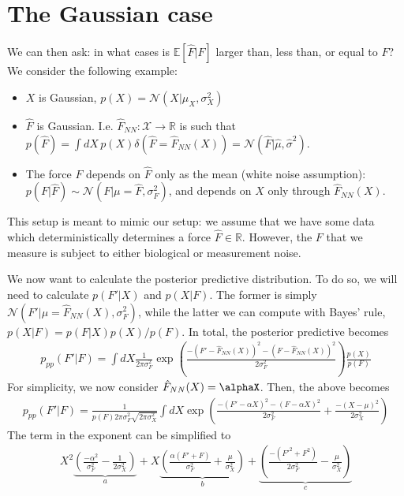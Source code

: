 \documentclass{article}
\begin{document}
\section{The Gaussian case}
We can then ask: in what cases is $\mathbb{E}[\hat F|F]$ larger than, less than, or equal to $F$? 
We consider the following example: 
\begin{itemize}
    \item $X$ is Gaussian, $p(X)=\mathcal{N}(X| \mu_X, \sigma_X^2)$
    \item $\hat F$ is Gaussian. I.e. $\hat F_{NN}:\mathcal{X}\rightarrow \mathbb{R}$ is such that $p(\hat F)=\int dX \, p(X)\delta(\hat F = \hat F_{NN}(X)) = \mathcal{N}(\hat F| \hat \mu, \hat \sigma^2)$.
    \item The force $F$ depends on $\hat F$ only as the mean (white noise assumption): $p(F | \hat F)\sim \mathcal{N}( F| \mu=\hat F,  \sigma^2_F)$, and depends on $X$ only through $\hat F_{NN}(X)$.
\end{itemize}
This setup is meant to mimic our setup: we assume that we have some data which deterministically determines a force $\hat F\in \mathbb{R}$. However, the $F$ that we measure is subject to either biological or measurement noise.
\par
We now want to calculate the posterior predictive distribution. To do so, we will need to calculate $p(F'|X)$ and $p(X|F)$. The former is simply $\mathcal{N}(F'|\mu=\hat{F}_{NN}(X), \sigma_F^2)$, while the latter we can compute with Bayes' rule, $p(X|F)=p(F|X)p(X)/p(F)$. In total, the posterior predictive becomes
\begin{align*}
    p_{pp}(F'|F) = \int dX \frac{1}{2\pi \sigma_F^2}\exp\left(\frac{-(F'-\hat{F}_{NN}(X))^2 -(F-\hat{F}_{NN}(X))^2}{2 \sigma_F^2}\right)\frac{p(X)}{p(F)}
\end{align*}
For simplicity, we now consider $\hat{F}_{NN}(X)=\alphaX$.
Then, the above becomes
\begin{align*}
    p_{pp}(F'|F) = \frac{1}{p(F)2\pi \sigma_F^2\sqrt{2\pi \sigma_X^2}}\int dX \exp\left(\frac{-(F'- \alpha X)^2 -(F-\alpha X)^2}{2 \sigma_F^2}
    +
    \frac{-(X-\mu)^2}{2 \sigma_X^2}\right)
\end{align*}
The term in the exponent can be simplified to
\begin{align*}
    X^2 \underbrace{\left(\frac{-\alpha^2}{\sigma_F^2} - \frac{1}{2\sigma_X^2}\right) }_{a}
    + X\underbrace{\left(\frac{\alpha(F'+F)}{\sigma_F^2} + \frac{\mu}{\sigma_X^2}\right)}_{b}
    + \underbrace{\left(\frac{-(F'^2+F^2)}{2\sigma_F^2} - \frac{\mu}{\sigma_X^2}\right)}_{c}
\end{align*}
\end{document}
